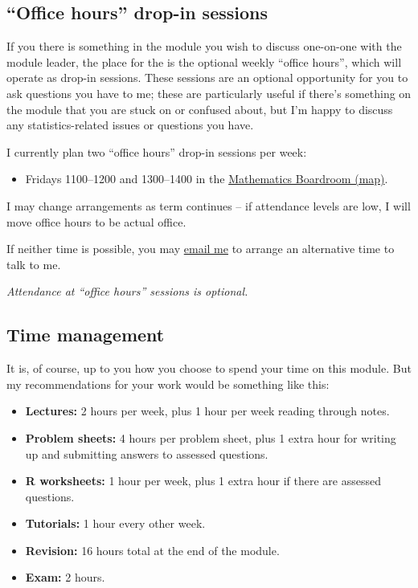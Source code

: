 \documentclass[
  a4paper,
]{book}
\providecommand{\tightlist}{%
  \setlength{\itemsep}{0pt}\setlength{\parskip}{0pt}}
\theoremstyle{definition}
\theoremstyle{definition}
\theoremstyle{definition}
\theoremstyle{definition}
\theoremstyle{remark}
\begin{document}
\hypertarget{dropin}{%
\subsection*{``Office hours'' drop-in sessions}\label{dropin}}

If you there is something in the module you wish to discuss one-on-one with the module leader, the place for the is the optional weekly ``office hours'', which will operate as drop-in sessions. These sessions are an optional opportunity for you to ask questions you have to me; these are particularly useful if there's something on the module that you are stuck on or confused about, but I'm happy to discuss any statistics-related issues or questions you have.

I currently plan two ``office hours'' drop-in sessions per week:

\begin{itemize}
\tightlist
\item
  Fridays 1100--1200 and 1300--1400 in the \href{boardroom.png}{Mathematics Boardroom (map)}.
\end{itemize}

I may change arrangements as term continues -- if attendance levels are low, I will move office hours to be actual office.

If neither time is possible, you may \href{mailto:m.aldridge@leeds.ac.uk}{email me} to arrange an alternative time to talk to me.

\emph{Attendance at ``office hours'' sessions is optional.}

\hypertarget{time}{%
\subsection*{Time management}\label{time}}

It is, of course, up to you how you choose to spend your time on this module. But my recommendations for your work would be something like this:

\begin{itemize}
\tightlist
\item
  \textbf{Lectures:} 2 hours per week, plus 1 hour per week reading through notes.
\item
  \textbf{Problem sheets:} 4 hours per problem sheet, plus 1 extra hour for writing up and submitting answers to assessed questions.
\item
  \textbf{R worksheets:} 1 hour per week, plus 1 extra hour if there are assessed questions.
\item
  \textbf{Tutorials:} 1 hour every other week.
\item
  \textbf{Revision:} 16 hours total at the end of the module.
\item
  \textbf{Exam:} 2 hours.
\end{itemize}
\end{document}
